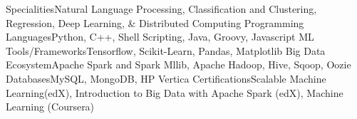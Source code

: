 \begin{cvskills}
\cvskill
{Specialities}{Natural Language Processing, Classification and Clustering, Regression, Deep Learning, \& Distributed Computing}
\cvskill
{Programming Languages}{Python, C++, Shell Scripting, Java, Groovy, Javascript}
\cvskill
{ML Tools/Frameworks}{Tensorflow, Scikit-Learn, Pandas, Matplotlib}
\cvskill
{Big Data Ecosystem}{Apache Spark and Spark Mllib, Apache Hadoop, Hive, Sqoop, Oozie}
\cvskill
{Databases}{MySQL, MongoDB, HP Vertica}
\cvskill
{Certifications}{Scalable Machine Learning(edX), Introduction to Big Data with Apache Spark (edX), Machine Learning (Coursera)}
\end{cvskills}
